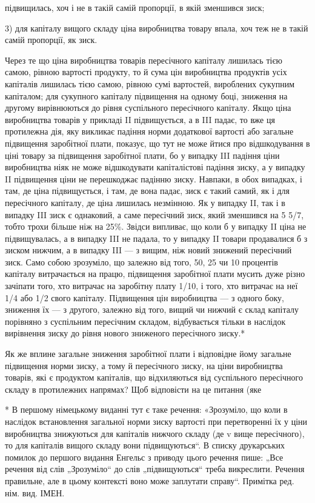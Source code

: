 підвищилась, хоч і не в такій самій пропорції, в якій зменшився
зиск;

3) для капіталу вищого складу ціна виробництва товару впала,
хоч теж не в такій самій пропорції, як зиск.

Через те що ціна виробництва товарів пересічного капіталу
лишилась тією самою, рівною вартості продукту, то й сума цін
виробництва продуктів усіх капіталів лишилась тією самою,
рівною сумі вартостей, вироблених сукупним капіталом; для
сукупного капіталу підвищення на одному боці, зниження на
другому вирівнюються до рівня суспільного пересічного капіталу.
Якщо ціна виробництва товарів у прикладі II підвищується,
а в III падає, то вже ця протилежна дія, яку викликає падіння
норми додаткової вартості або загальне підвищення заробітної
плати, показує, що тут не може йтися про відшкодування в
ціні товару за підвищення заробітної плати, бо у випадку III падіння
ціни виробництва ніяк не може відшкодувати капіталістові
падіння зиску, а у випадку II підвищення ціни не перешкоджає
падінню зиску. Навпаки, в обох випадках, і там, де ціна підвищується,
і там, де вона падає, зиск є такий самий, як і для
пересічного капіталу, де ціна лишилась незмінною. Як у випадку
II, так і в випадку III зиск є однаковий, а саме пересічний
зиск, який зменшився на 5 5/7, тобто трохи більше ніж на 25\%.
Звідси випливає, що коли б у випадку II ціна не підвищувалась,
а в випадку III не падала, то у випадку II товари продавалися б
з зиском нижчим, а в випадку III — з вищим, ніж новий знижений
пересічний зиск. Само собою зрозуміло, що залежно від
того, 50, 25 чи 10 процентів капіталу витрачається на працю,
підвищення заробітної плати мусить дуже різно зачіпати
того, хто витрачає на заробітну плату 1/10, і того, хто витрачає
на неї 1/4 або 1/2 свого капіталу. Підвищення цін виробництва
— з одного боку, зниження їх — з другого, залежно від
того, вищий чи нижчий є склад капіталу порівняно з суспільним
пересічним складом, відбувається тільки в наслідок вирівнення
зиску до рівня нового зниженого пересічного зиску.*

Як же вплине загальне зниження заробітної плати і відповідне
йому загальне підвищення норми зиску, а тому й пересічного
зиску, на ціни виробництва товарів, які є продуктом
капіталів, що відхиляються від суспільного пересічного складу
в протилежних напрямах? Щоб відповісти на це питання (яке

* В першому німецькому виданні тут є таке речення: «Зрозуміло, що коли
в наслідок встановлення загальної норми зиску вартості при перетворенні їх
у ціни виробництва знижуються для капіталів нижчого складу (де v вище пересічного),
то для капіталів вищого складу вони підвищуються“. В списку друкарських
помилок до першого видання Енгельс з приводу цього речення
пише: „Все речення від слів „Зрозуміло“ до слів „підвищуються“ треба викреслити.
Речення правильне, але в цьому контексті воно може заплутати
справу“. Примітка ред. нім. вид. ІМЕН.
